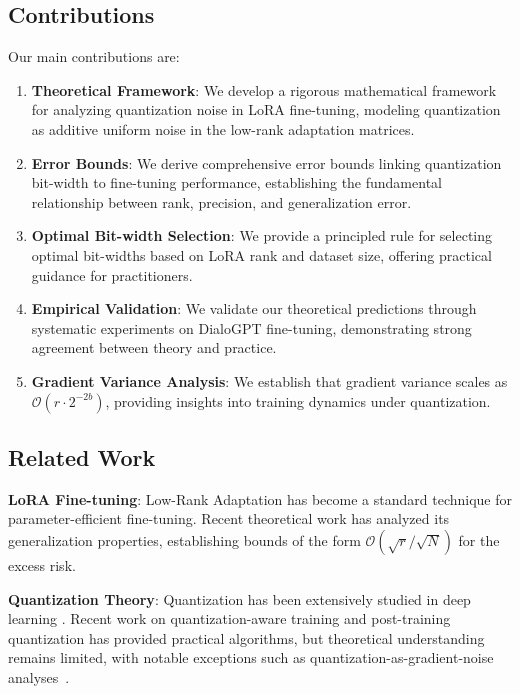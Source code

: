 \documentclass[10pt,twocolumn]{article}
\begin{document}
\subsection{Contributions}

Our main contributions are:

\begin{enumerate}
\item \textbf{Theoretical Framework}: We develop a rigorous mathematical framework for analyzing quantization noise in LoRA fine-tuning, modeling quantization as additive uniform noise in the low-rank adaptation matrices.

\item \textbf{Error Bounds}: We derive comprehensive error bounds linking quantization bit-width to fine-tuning performance, establishing the fundamental relationship between rank, precision, and generalization error.

\item \textbf{Optimal Bit-width Selection}: We provide a principled rule for selecting optimal bit-widths based on LoRA rank and dataset size, offering practical guidance for practitioners.

\item \textbf{Empirical Validation}: We validate our theoretical predictions through systematic experiments on DialoGPT fine-tuning, demonstrating strong agreement between theory and practice.

\item \textbf{Gradient Variance Analysis}: We establish that gradient variance scales as $\mathcal{O}(r \cdot 2^{-2b})$, providing insights into training dynamics under quantization.
\end{enumerate}

\subsection{Related Work}

\textbf{LoRA Fine-tuning}: Low-Rank Adaptation \citep{hu2021lora} has become a standard technique for parameter-efficient fine-tuning. Recent theoretical work \citep{malladi2023kernel, wang2023lora} has analyzed its generalization properties, establishing bounds of the form $\mathcal{O}(\sqrt{r}/\sqrt{N})$ for the excess risk.

\textbf{Quantization Theory}: Quantization has been extensively studied in deep learning \citep{jacob2018quantization, banner2018post}. Recent work on quantization-aware training \citep{esser2019learned} and post-training quantization \citep{nagel2020up} has provided practical algorithms, but theoretical understanding remains limited, with notable exceptions such as quantization-as-gradient-noise analyses~\citep{liu2022quantnoise}.
\end{document}
